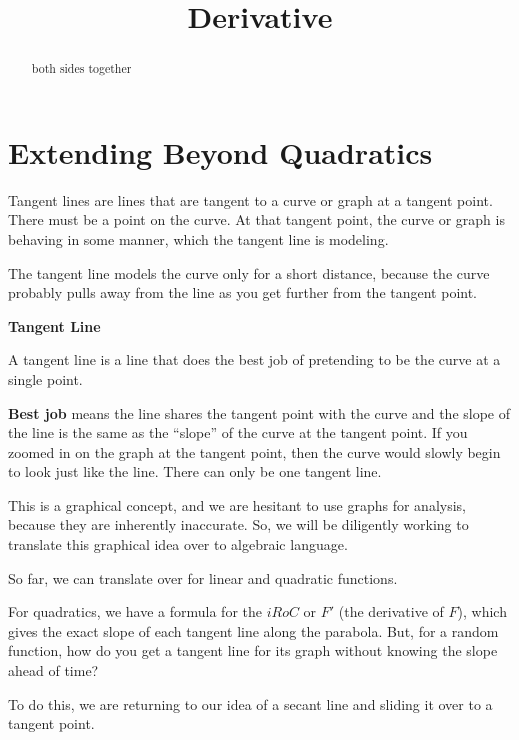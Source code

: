 \documentclass{ximera}
\title{Derivative}
\begin{document}
\begin{abstract}
both sides together
\end{abstract}
\maketitle
 
 



\section*{Extending Beyond Quadratics} 


Tangent lines are lines that are tangent to a curve or graph at a tangent point. There must be a point on the curve. At that tangent point, the curve or graph is behaving in some manner, which the tangent line is modeling.  

The tangent line models the curve only for a short distance, because the curve probably pulls away from the line as you get further from the tangent point.

\begin{idea} \textbf{\textcolor{blue!55!black}{Tangent Line}}


A tangent line is a line that does the best job of pretending to be the curve at a single point.
\end{idea}


\textbf{Best job} means the line shares the tangent point with the curve and the slope of the line is the same as the ``slope'' of the curve at the tangent point. If you zoomed in on the graph at the tangent point, then the curve would slowly begin to look just like the line. There can only be one tangent line.

This is a graphical concept, and we are hesitant to use graphs for analysis, because they are inherently inaccurate. So, we will be diligently working to translate this graphical idea over to algebraic language. 

So far, we can translate over for linear and quadratic functions.

For quadratics, we have a formula for the $iRoC$ or $F'$ (the derivative of $F$), which gives the exact slope of each tangent line along the parabola.  But, for a random function, how do you get a tangent line for its graph without knowing the slope ahead of time? 


To do this, we are returning to our idea of a secant line and sliding it over to a tangent point. 
\end{document}
